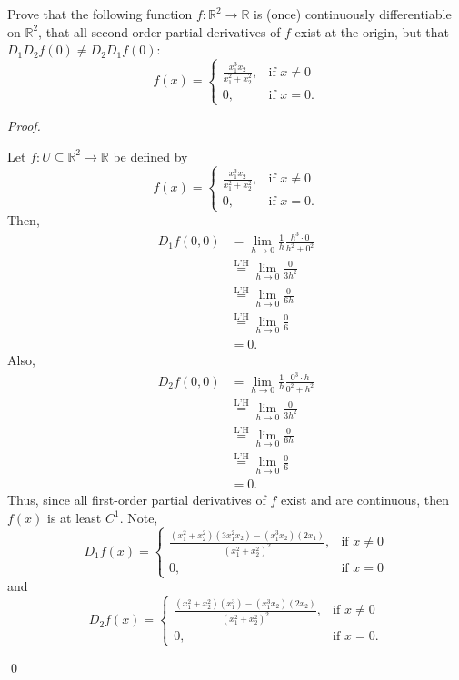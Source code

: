 \documentclass[12pt]{article}
\newenvironment{problem}[2][Problem]{\begin{trivlist}
\item[\hskip \labelsep {\bfseries #1}\hskip \labelsep {\bfseries
#2.}]}{\end{trivlist}}
\newenvironment{sol}
    {\emph{Proof.}
    }
    {
    \qed
    }
\begin{document}
\begin{problem}{17}
  Prove that the following function $f : \mathbb{R}^2 \to \mathbb{R}$ is (once) continuously differentiable on $\mathbb{R}^2$, that all second-order partial derivatives of $f$ exist at the origin, but that $D_1D_2f(0) \neq D_2D_1f(0):$ $$f(x) = \begin{cases} 
        \frac{x_1^3x_2}{x_1^2 + x_2^2}, &\text{if } x \neq 0 \\ 0, & \text{if } x = 0. 
     \end{cases}$$
  \end{problem}
  \begin{sol}
  Let $f : U \subseteq \mathbb{R}^2 \to \mathbb{R}$ be defined by $$f(x) = \begin{cases} 
        \frac{x_1^3x_2}{x_1^2 + x_2^2}, &\text{if } x \neq 0 \\ 0, & \text{if } x = 0. 
     \end{cases}$$ Then, \begin{align*}
         D_1f(0,0) &= \lim_{h \to 0}\frac{1}{h}\frac{h^3 \cdot 0}{h^2+0^2} \\ &\stackrel{\text{L'H}}{=} \lim_{h \to 0} \frac{0}{3h^2} \\ &\stackrel{\text{L'H}}{=} \lim_{h \to 0} \frac{0}{6h}  \\ &\stackrel{\text{L'H}}{=} \lim_{h \to 0} \frac{0}{6} \\ &= 0.
     \end{align*} 
     Also, \begin{align*}
         D_2f(0,0) &= \lim_{h \to 0}\frac{1}{h}\frac{0^3 \cdot h}{0^2 + h^2} \\ &\stackrel{\text{L'H}}{=} \lim_{h \to 0} \frac{0}{3h^2} \\ &\stackrel{\text{L'H}}{=} \lim_{h \to 0} \frac{0}{6h}  \\ &\stackrel{\text{L'H}}{=} \lim_{h \to 0} \frac{0}{6} \\ &= 0.
     \end{align*} 
     Thus, since all first-order partial derivatives of $f$ exist and are continuous, then $f(x)$ is at least $C^1$. Note, $$D_1f(x) = \begin{cases} 
        \frac{(x_1^2 + x_2^2)(3x_1^2x_2) - (x_1^3x_2)(2x_1)}{(x_1^2 + x_2^2)^2}, &\text{if } x \neq 0 \\ 0, & \text{if } x = 0
     \end{cases}$$ and $$D_2f(x) = \begin{cases} 
        \frac{(x_1^2 + x_2^2)(x_1^3) - (x_1^3x_2)(2x_2)}{(x_1^2 + x_2^2)^2}, &\text{if } x \neq 0 \\ 0, & \text{if } x = 0.
     \end{cases}$$
     

\end{sol}
\end{document}
